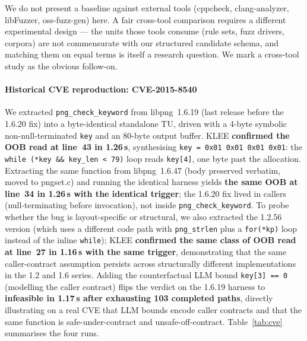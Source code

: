 \documentclass[3p,times,procedia]{elsarticle}
\begin{document}
We do not present a baseline against external tools (cppcheck, clang-analyzer, libFuzzer, oss-fuzz-gen) here. A fair cross-tool comparison requires a different experimental design --- the units those tools consume (rule sets, fuzz drivers, corpora) are not commensurate with our structured candidate schema, and matching them on equal terms is itself a research question. We mark a cross-tool study as the obvious follow-on.

\paragraph{Historical CVE reproduction: CVE-2015-8540 \cite{cve20158540}} We extracted \texttt{png\_check\_keyword} from libpng~1.6.19 (last release before the 1.6.20 fix) into a byte-identical standalone TU, driven with a 4-byte symbolic non-null-terminated \texttt{key} and an 80-byte output buffer. KLEE \textbf{confirmed the OOB read at line~43 in 1.26\,s}, synthesising \texttt{key = 0x01\,0x01\,0x01\,0x01}: the \texttt{while (*key \&\& key\_len < 79)} loop reads \texttt{key[4]}, one byte past the allocation. Extracting the same function from libpng~1.6.47 (body preserved verbatim, moved to pngset.c) and running the identical harness yields \textbf{the same OOB at line~34 in 1.26\,s with the identical trigger}; the 1.6.20 fix lived in callers (null-terminating before invocation), not inside \texttt{png\_check\_keyword}. To probe whether the bug is layout-specific or structural, we also extracted the 1.2.56 version (which uses a different code path with \texttt{png\_strlen} plus a \texttt{for(*kp)} loop instead of the inline \texttt{while}); KLEE \textbf{confirmed the same class of OOB read at line~27 in 1.16\,s with the same trigger}, demonstrating that the same caller-contract assumption persists across structurally different implementations in the 1.2 and 1.6 series. Adding the counterfactual LLM bound \texttt{key[3] == 0} (modelling the caller contract) flips the verdict on the 1.6.19 harness to \textbf{infeasible in 1.17\,s after exhausting 103 completed paths}, directly illustrating on a real CVE that LLM bounds encode caller contracts and that the same function is safe-under-contract and unsafe-off-contract. Table~\ref{tab:cve} summarises the four runs.
\end{document}
